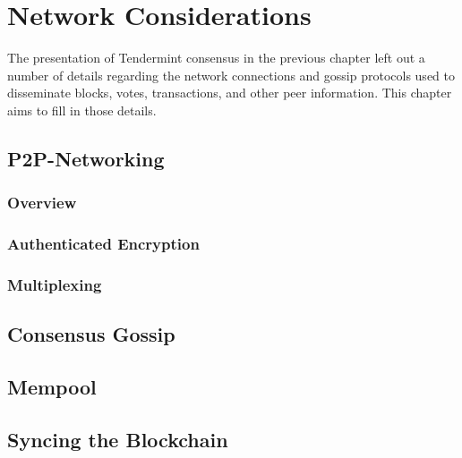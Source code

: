 \chapter{Network Considerations}
\label{ch:network}

The presentation of Tendermint consensus in the previous chapter left out a number of details
regarding the network connections and gossip protocols used to disseminate blocks, votes, transactions, 
and other peer information. This chapter aims to fill in those details.

\section{P2P-Networking}
\subsection{Overview}
\subsection{Authenticated Encryption}
\subsection{Multiplexing}

\section{Consensus Gossip}


\section{Mempool}


\section{Syncing the Blockchain}
